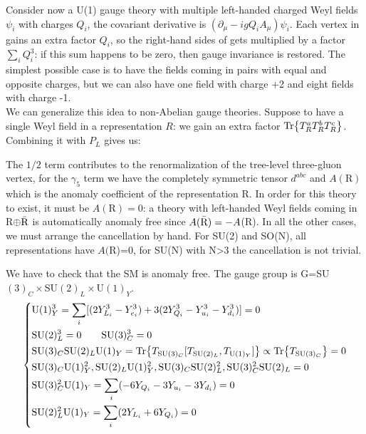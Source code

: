 \documentclass[../main.tex]{subfiles}
\begin{document}
Consider now a U(1) gauge theory with multiple left-handed charged Weyl fields $\psi_i$ with charges $Q_i$, the covariant derivative is $(\partial_\mu-igQ_iA_\mu)\psi_i$. Each vertex in  gains an extra factor $Q_i$, so the right-hand sides of  gets multiplied by a factor $\sum_i Q_i^3$: if this sum happens to be zero, then gauge invariance is restored. The simplest possible case is to have the fields coming in pairs with equal and opposite charges, but we can also have one field with charge +2 and eight fields with charge -1.\\
We can generalize this idea to non-Abelian gauge theories. Suppose to have a single Weyl field in a representation $R$: we gain an extra factor $\Tr{T_R^aT_R^bT_R^c}$. Combining it with $P_L$ gives us:\\
\begin{center}
\end{center}
The $1/2$ term contributes to the renormalization of the tree-level three-gluon vertex, for the $\gamma_5$ term we have the completely symmetric tensor $d^{abc}$ and $A(\text{R})$ which is the anomaly coefficient of the representation R. In order for this theory to exist, it must be $A(\text{R})=0$: a theory with left-handed Weyl fields coming in R$\oplus\Bar{\text{R}}$ is automatically anomaly free since $A(\Bar{\text{R}})=-A$(R). In all the other cases, we must arrange the cancellation by hand. For SU(2) and SO(N), all representations have $A($R)=0, for SU(N) with N>3 the cancellation is not trivial.

We have to check that the SM is anomaly free. The gauge group is G=SU$(3)_C\times$SU$(2)_L\times$U$(1)_Y$.
\[
\left\{
\begin{aligned}
&\text{U}(1)_Y^3=\sum_i[(2Y_{L_i}^3-Y_{e_i}^3)+3(2Y_{Q_i}^3-Y_{u_i}^3-Y_{d_i}^3)]=0\\
&\text{SU}(2)_L^3=0 \qquad \text{SU}(3)_C^3=0\\
&\text{SU}(3)_C\text{SU}(2)_L\text{U}(1)_Y=\Tr{T_{\text{SU}(3)_C}[T_{\text{SU}(2)_L},T_{\text{U}(1)_Y}]}\propto\Tr{T_{\text{SU}(3)_C}}=0\\
&\text{SU}(3)_C\text{U}(1)_Y^2, \text{SU}(2)_L\text{U}(1)_Y^2, \text{SU}(3)_C\text{SU}(2)_L^2, \text{SU}(3)_C^2\text{SU}(2)_L=0\\
&\text{SU}(3)_C^2\text{U}(1)_Y=\sum_i(-6Y_{Q_i}-3Y_{u_i}-3Y_{d_i})=0\\
&\text{SU}(2)_L^2\text{U}(1)_Y=\sum_i(2Y_{L_i}+6Y_{Q_i})=0
\end{aligned}
\right.
\]
\end{document}
